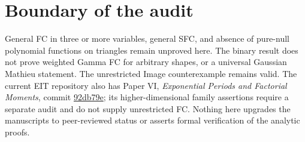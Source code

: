 \documentclass[11pt]{article}
\begin{document}
\section{Boundary of the audit}
General FC in three or more variables, general SFC, and absence of
pure-null polynomial functions on triangles remain unproved here.
The binary result does not prove weighted Gamma FC for arbitrary shapes,
or a universal Gaussian Mathieu statement. The unrestricted Image
counterexample remains valid. The current EIT repository also has Paper VI,
\emph{Exponential Periods and Factorial Moments}, commit
\href{https://github.com/long-mathematics/exponential-integral-theorem/tree/92db79eedeb064694ff20e9201d73fc2bc0857f4}{92db79e};
its higher-dimensional family assertions require a separate audit and do
not supply unrestricted FC. Nothing here upgrades the manuscripts to
peer-reviewed status or asserts formal verification of the analytic proofs.
\end{document}
